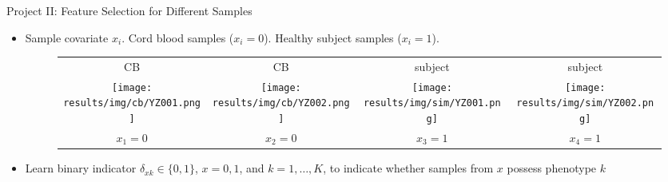 \documentclass[ignorenonframetext,]{beamer}
\newcommand{\iid}{\overset{iid}{\sim}}
\newcommand{\ind}{\overset{ind}{\sim}}
\begin{document}
\begin{frame}{Project II: Feature Selection for Different Samples}
  \begin{itemize}
    \item Sample covariate $x_i$. Cord blood samples ($x_i=0$). Healthy subject samples ($x_i=1$).
    \begin{figure}
      \begin{tabular}{cccc}
      {CB} & {CB} & {subject} & {subject} \\
      \texttt{[image: results/img/cb/YZ001.png]} &
      \texttt{[image: results/img/cb/YZ002.png]} &
      \texttt{[image: results/img/sim/YZ001.png]} &
      \texttt{[image: results/img/sim/YZ002.png]} \\
      {$x_1=0$} & {$x_2=0$} & {$x_3=1$} & {$x_4=1$} \\
      \end{tabular}
    \end{figure}
    \pause
    \item Learn binary indicator $\delta_{xk}\in \{0, 1\}$, $x=0,1$, and
      $k=1,\ldots, K$, to indicate whether samples from $x$ possess phenotype
      $k$ 
  \end{itemize}
\end{frame}
\end{document}
